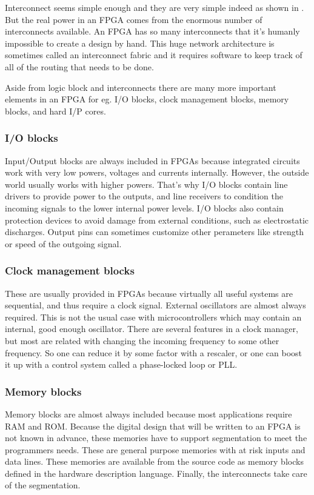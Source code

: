 Interconnect seems simple enough and they are very simple indeed as shown in . But the real power in an FPGA comes from the enormous number of interconnects available. An FPGA has so many interconnects that it's humanly impossible to create a design by hand. This huge network architecture is sometimes called an interconnect fabric and it requires software to keep track of all of the routing that needs to be done.

Aside from logic block and interconnects there are many more important elements in an FPGA for eg. I/O blocks, clock management blocks, memory blocks, and hard I/P cores.

\subsubsection{I/O blocks}
Input/Output blocks are always included in FPGAs because integrated circuits work with very low powers, voltages and currents internally. However, the outside world usually works with higher powers. That's why I/O blocks contain line drivers to provide power to the outputs, and line receivers to condition the incoming signals to the lower internal power levels. I/O blocks also contain protection devices to avoid damage from external conditions, such as electrostatic discharges. Output pins can sometimes customize other perameters like strength or speed of the outgoing signal.

\subsubsection{Clock management blocks}
These are usually provided in FPGAs because virtually all useful systems are sequential, and thus require a clock signal. External oscillators are almost always required. This is not the usual case with microcontrollers which may contain an internal, good enough oscillator. There are several features in a clock manager, but most are related with changing the incoming frequency to some other frequency. So one can reduce it by some factor with a rescaler, or one can boost it up with a control system called a phase-locked loop or PLL. 

\subsubsection{Memory blocks}
Memory blocks are almost always included because most applications require RAM and ROM. Because the digital design that will be written to an FPGA is not known in advance, these memories have to support segmentation to meet the programmers needs. These are general purpose memories with at risk inputs and data lines. These memories are available from the source code as memory blocks defined in the hardware description language. Finally, the interconnects take care of the segmentation. 

